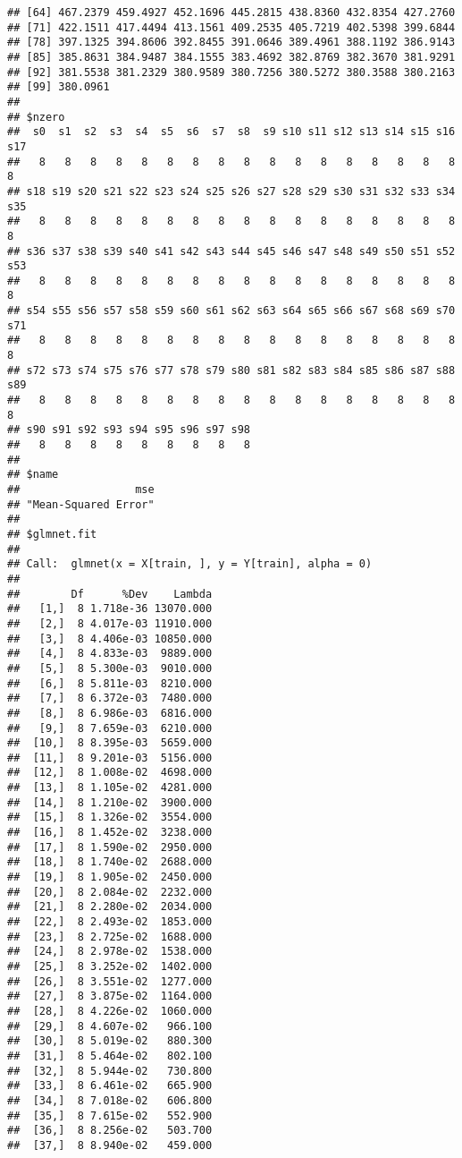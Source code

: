 \documentclass[]{article}
\begin{document}
\begin{verbatim}
## [64] 467.2379 459.4927 452.1696 445.2815 438.8360 432.8354 427.2760
## [71] 422.1511 417.4494 413.1561 409.2535 405.7219 402.5398 399.6844
## [78] 397.1325 394.8606 392.8455 391.0646 389.4961 388.1192 386.9143
## [85] 385.8631 384.9487 384.1555 383.4692 382.8769 382.3670 381.9291
## [92] 381.5538 381.2329 380.9589 380.7256 380.5272 380.3588 380.2163
## [99] 380.0961
## 
## $nzero
##  s0  s1  s2  s3  s4  s5  s6  s7  s8  s9 s10 s11 s12 s13 s14 s15 s16 s17 
##   8   8   8   8   8   8   8   8   8   8   8   8   8   8   8   8   8   8 
## s18 s19 s20 s21 s22 s23 s24 s25 s26 s27 s28 s29 s30 s31 s32 s33 s34 s35 
##   8   8   8   8   8   8   8   8   8   8   8   8   8   8   8   8   8   8 
## s36 s37 s38 s39 s40 s41 s42 s43 s44 s45 s46 s47 s48 s49 s50 s51 s52 s53 
##   8   8   8   8   8   8   8   8   8   8   8   8   8   8   8   8   8   8 
## s54 s55 s56 s57 s58 s59 s60 s61 s62 s63 s64 s65 s66 s67 s68 s69 s70 s71 
##   8   8   8   8   8   8   8   8   8   8   8   8   8   8   8   8   8   8 
## s72 s73 s74 s75 s76 s77 s78 s79 s80 s81 s82 s83 s84 s85 s86 s87 s88 s89 
##   8   8   8   8   8   8   8   8   8   8   8   8   8   8   8   8   8   8 
## s90 s91 s92 s93 s94 s95 s96 s97 s98 
##   8   8   8   8   8   8   8   8   8 
## 
## $name
##                  mse 
## "Mean-Squared Error" 
## 
## $glmnet.fit
## 
## Call:  glmnet(x = X[train, ], y = Y[train], alpha = 0) 
## 
##        Df      %Dev    Lambda
##   [1,]  8 1.718e-36 13070.000
##   [2,]  8 4.017e-03 11910.000
##   [3,]  8 4.406e-03 10850.000
##   [4,]  8 4.833e-03  9889.000
##   [5,]  8 5.300e-03  9010.000
##   [6,]  8 5.811e-03  8210.000
##   [7,]  8 6.372e-03  7480.000
##   [8,]  8 6.986e-03  6816.000
##   [9,]  8 7.659e-03  6210.000
##  [10,]  8 8.395e-03  5659.000
##  [11,]  8 9.201e-03  5156.000
##  [12,]  8 1.008e-02  4698.000
##  [13,]  8 1.105e-02  4281.000
##  [14,]  8 1.210e-02  3900.000
##  [15,]  8 1.326e-02  3554.000
##  [16,]  8 1.452e-02  3238.000
##  [17,]  8 1.590e-02  2950.000
##  [18,]  8 1.740e-02  2688.000
##  [19,]  8 1.905e-02  2450.000
##  [20,]  8 2.084e-02  2232.000
##  [21,]  8 2.280e-02  2034.000
##  [22,]  8 2.493e-02  1853.000
##  [23,]  8 2.725e-02  1688.000
##  [24,]  8 2.978e-02  1538.000
##  [25,]  8 3.252e-02  1402.000
##  [26,]  8 3.551e-02  1277.000
##  [27,]  8 3.875e-02  1164.000
##  [28,]  8 4.226e-02  1060.000
##  [29,]  8 4.607e-02   966.100
##  [30,]  8 5.019e-02   880.300
##  [31,]  8 5.464e-02   802.100
##  [32,]  8 5.944e-02   730.800
##  [33,]  8 6.461e-02   665.900
##  [34,]  8 7.018e-02   606.800
##  [35,]  8 7.615e-02   552.900
##  [36,]  8 8.256e-02   503.700
##  [37,]  8 8.940e-02   459.000

\end{verbatim}
\end{document}
